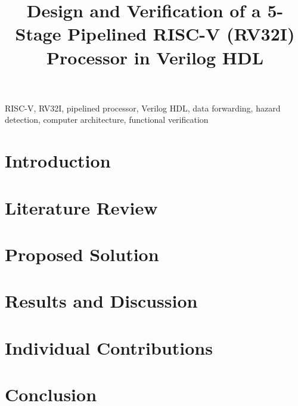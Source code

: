 \documentclass[conference]{IEEEtran}
\begin{document}
\title{Design and Verification of a 5-Stage Pipelined RISC-V (RV32I) Processor in Verilog HDL}
\author{\and{}\and{}\and{}\and{}}
\maketitle

\begin{abstract}

\end{abstract}

\begin{IEEEkeywords}
RISC-V, RV32I, pipelined processor, Verilog HDL, data forwarding, hazard detection,
computer architecture, functional verification
\end{IEEEkeywords}

\section{Introduction}
\PhaseIIntroduction

\section{Literature Review}


\section{Proposed Solution}




\section{Results and Discussion}





\section{Individual Contributions}






\section{Conclusion}




\end{document}
